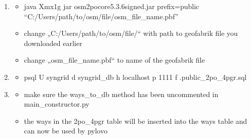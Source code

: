 \documentclass[letterpaper,10pt,english]{sphinxmanual}
\begin{document}
\begin{enumerate}
\begin{description}
\end{description}

\item {} \begin{description}
\begin{itemize}
\item {} 
\sphinxAtStartPar
java \sphinxhyphen{}Xmx1g \sphinxhyphen{}jar osm2po\sphinxhyphen{}core\sphinxhyphen{}5.3.6\sphinxhyphen{}signed.jar prefix=public “C:/Users/path/to/osm/file/osm\_file\_name.pbf”

\item {} 
\sphinxAtStartPar
change „C:/Users/path/to/osm/file/“ with path to geofabrik file you downloaded earlier

\item {} 
\sphinxAtStartPar
change „osm\_file\_name.pbf“ to name of the geofabrik file

\end{itemize}

\end{description}

\item {} \begin{description}
\begin{itemize}
\item {} 
\sphinxAtStartPar
psql \sphinxhyphen{}U syngrid \sphinxhyphen{}d syngrid\_db \sphinxhyphen{}h localhost \sphinxhyphen{}p 1111 \sphinxhyphen{}f .public\_2po\_4pgr.sql

\end{itemize}

\end{description}

\item {} \begin{description}
\begin{itemize}
\item {} 
\sphinxAtStartPar
make sure the ways\_to\_db method has been uncommented in main\_constructor.py

\item {} 
\sphinxAtStartPar
the ways in the 2po\_4pgr table will be inserted into the ways table and can now be used by pylovo

\end{itemize}

\end{description}

\end{enumerate}
\end{document}
